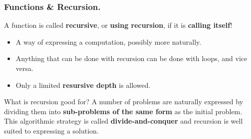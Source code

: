 \documentclass{beamer} %
\newcommand\emc[1]{\textcolor{midred}{\textbf{#1}}}
\begin{document}
\begin{frame}
\frametitle{Functions \& Recursion.}

A function is called \emc{recursive}, or \emc{using recursion}, if it is \emc{calling itself}!
\begin{itemize}
	\item A way of expressing a computation, possibly more naturally.
	\item Anything that can be done with recursion can be done with loops, and vice versa.
	\item Only a limited \emc{resursive depth} is allowed.
\end{itemize}

\begin{block}{What is recursion good for?}
A number of problems are naturally expressed by dividing them into \emc{sub-problems of the same form} as the initial problem. This algorithmic strategy is called \emc{divide-and-conquer} and recursion is well suited to expressing a solution.
\end{block}

\end{frame}



\end{document}
